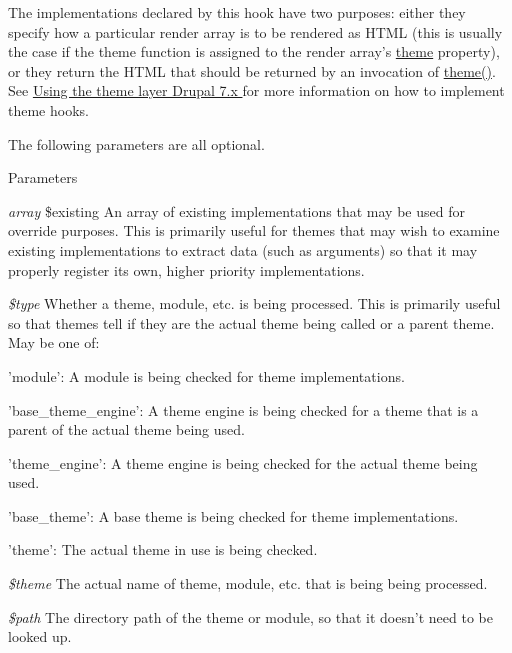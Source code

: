 The implementations declared by this hook have two purposes: either they specify how a particular render array is to be rendered as HTML (this is usually the case if the theme function is assigned to the render array's \hyperlink{includes_2theme_8inc_a7c25609a935874541a19657affd30fff}{theme} property), or they return the HTML that should be returned by an invocation of \hyperlink{includes_2theme_8inc_a7c25609a935874541a19657affd30fff}{theme()}. See \hyperlink{}{Using the theme layer Drupal 7.x } for more information on how to implement theme hooks.

The following parameters are all optional.


\begin{DoxyParams}{Parameters}
\item[{\em array}]\$existing An array of existing implementations that may be used for override purposes. This is primarily useful for themes that may wish to examine existing implementations to extract data (such as arguments) so that it may properly register its own, higher priority implementations. \item[{\em \$type}]Whether a theme, module, etc. is being processed. This is primarily useful so that themes tell if they are the actual theme being called or a parent theme. May be one of:
\begin{DoxyItemize}
\item 'module': A module is being checked for theme implementations.
\item 'base\_\-theme\_\-engine': A theme engine is being checked for a theme that is a parent of the actual theme being used.
\item 'theme\_\-engine': A theme engine is being checked for the actual theme being used.
\item 'base\_\-theme': A base theme is being checked for theme implementations.
\item 'theme': The actual theme in use is being checked. 
\end{DoxyItemize}\item[{\em \$theme}]The actual name of theme, module, etc. that is being being processed. \item[{\em \$path}]The directory path of the theme or module, so that it doesn't need to be looked up.\end{DoxyParams}
